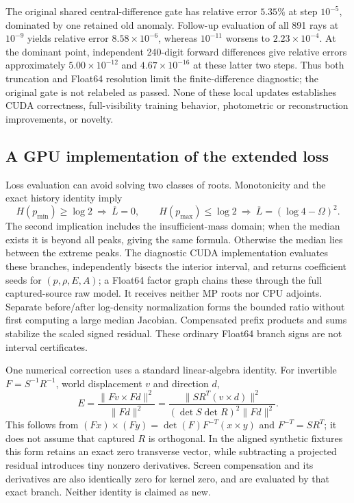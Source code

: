 \documentclass[11pt,a4paper]{article}
\begin{document}
The original shared central-difference gate has relative error $5.35\%$
at step $10^{-5}$, dominated by one retained old anomaly. Follow-up
evaluation of all 891 rays at $10^{-9}$ yields relative error
$8.58\times10^{-6}$, whereas $10^{-11}$ worsens to
$2.23\times10^{-4}$. At the dominant point, independent 240-digit
forward differences give relative errors approximately $5.00\times10^{-12}$
and $4.67\times10^{-16}$ at these latter two steps. Thus both truncation
and Float64 resolution limit the finite-difference diagnostic; the
original gate is not relabeled as passed. None of these local updates
establishes CUDA correctness, full-visibility training behavior,
photometric or reconstruction improvements, or novelty.

\subsection{A GPU implementation of the extended loss}
Loss evaluation can avoid solving two classes of roots. Monotonicity
and the exact history identity imply
\[
 H(p_{\min})\geq\log2\ \Longrightarrow\ \overline L=0,
 \qquad
 H(p_{\max})\leq\log2\ \Longrightarrow\
 \overline L=(\log4-\Omega)^2.
\]
The second implication includes the insufficient-mass domain; when
the median exists it is beyond all peaks, giving the same formula.
Otherwise the median lies between the extreme peaks. The diagnostic
CUDA implementation evaluates these branches, independently bisects
the interior interval, and returns coefficient seeds for
$(p,\rho,E,A)$; a Float64 factor graph chains these through the full
captured-source raw model. It receives neither MP roots nor CPU adjoints.
Separate before/after log-density normalization forms the bounded ratio
without first computing a large median Jacobian. Compensated prefix
products and sums stabilize the scaled signed residual. These ordinary
Float64 branch signs are not interval certificates.

One numerical correction uses a standard linear-algebra identity.
For invertible $F=S^{-1}R^{-1}$, world displacement $v$ and direction $d$,
\[
 E=\frac{\|Fv\mathbin{\times}Fd\|^2}{\|Fd\|^2}
  =\frac{\|SR^T(v\mathbin{\times}d)\|^2}
   {(\det S\det R)^2\|Fd\|^2}.
\]
This follows from
$(Fx)\times(Fy)=\det(F)F^{-T}(x\times y)$ and
$F^{-T}=SR^T$; it does not assume that captured $R$ is orthogonal.
In the aligned synthetic fixtures this form retains an exact zero
transverse vector, while subtracting a projected residual introduces
tiny nonzero derivatives. Screen compensation and its derivatives are
also identically zero for kernel zero, and are evaluated by that exact
branch. Neither identity is claimed as new.
\end{document}
